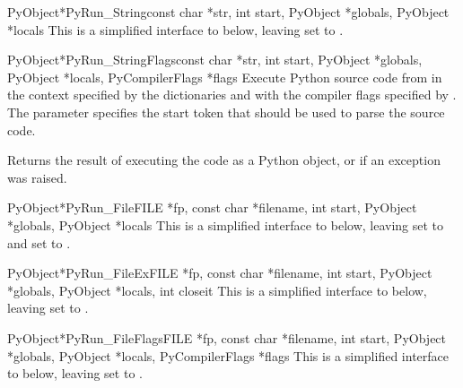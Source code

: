 \begin{cfuncdesc}{PyObject*}{PyRun_String}{const char *str, int start,
                                           PyObject *globals,
                                           PyObject *locals}
  This is a simplified interface to  below,
  leaving  set to \NULL.
\end{cfuncdesc}

\begin{cfuncdesc}{PyObject*}{PyRun_StringFlags}{const char *str, int start,
                                                PyObject *globals,
                                                PyObject *locals,
                                                PyCompilerFlags *flags}
  Execute Python source code from  in the context specified
  by the dictionaries  and  with the compiler
  flags specified by .  The parameter  specifies
  the start token that should be used to parse the source code.

  Returns the result of executing the code as a Python object, or
  \NULL{} if an exception was raised.
\end{cfuncdesc}

\begin{cfuncdesc}{PyObject*}{PyRun_File}{FILE *fp, const char *filename,
                                         int start, PyObject *globals,
                                         PyObject *locals}
  This is a simplified interface to  below,
  leaving  set to  and  set to \NULL.
\end{cfuncdesc}

\begin{cfuncdesc}{PyObject*}{PyRun_FileEx}{FILE *fp, const char *filename,
                                         int start, PyObject *globals,
                                         PyObject *locals, int closeit}
  This is a simplified interface to  below,
  leaving  set to \NULL.
\end{cfuncdesc}

\begin{cfuncdesc}{PyObject*}{PyRun_FileFlags}{FILE *fp, const char *filename,
                                         int start, PyObject *globals,
                                         PyObject *locals,
                                         PyCompilerFlags *flags}
  This is a simplified interface to  below,
  leaving  set to .
\end{cfuncdesc}

